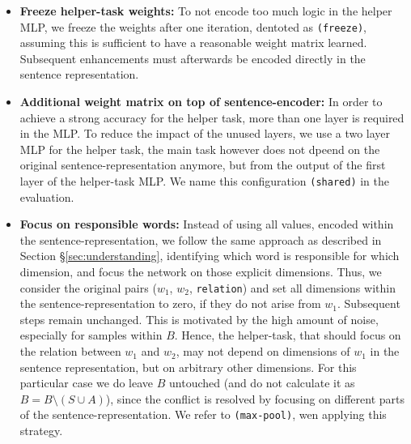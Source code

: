 \begin{itemize}
\item \textbf{Freeze helper-task weights:} To not encode too much logic in the helper \ac{MLP}, we freeze the weights after one iteration, dentoted as \texttt{(freeze)}, assuming this is sufficient to have a reasonable weight matrix learned. Subsequent enhancements must afterwards be encoded directly in the sentence representation. 
\item \textbf{Additional weight matrix on top of sentence-encoder:} In order to achieve a strong accuracy for the helper task, more than one layer is required in the \ac{MLP}. To reduce the impact of the unused layers, we use a two layer \ac{MLP} for the helper task, the main task however  does not dpeend on the original sentence-representation anymore, but from the output of the first layer of the helper-task \ac{MLP}. We name this configuration \texttt{(shared)} in the evaluation.
\item \textbf{Focus on responsible words:} Instead of using all values, encoded within the sentence-representation, we follow the same approach as described in Section §\ref{sec:understanding}, identifying which word is responsible for which dimension, and focus the network on those explicit dimensions. Thus, we consider the original pairs ($w_1$, $w_2$, \texttt{relation}) and set all dimensions within the sentence-representation to zero, if they do not arise from $w_1$. Subsequent steps remain unchanged. This is motivated by the high amount of noise, especially for samples within $B$. Hence, the helper-task, that should focus on the relation between $w_1$ and $w_2$, may not depend on dimensions of $w_1$ in the sentence representation, but on arbitrary other dimensions. For this particular case we do leave $B$ untouched (and do not calculate it as $B  = B \setminus (S \cup A)$), since the conflict is resolved by focusing on different parts of the sentence-representation. We refer to \texttt{(max-pool)}, wen applying this strategy.
\end{itemize}
